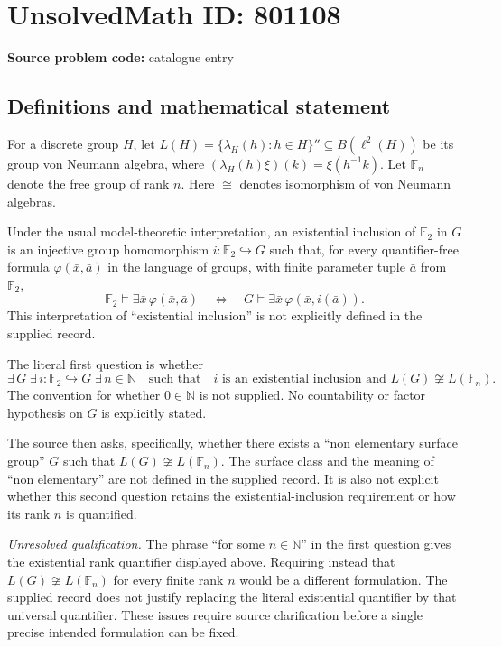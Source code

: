 \documentclass[11pt]{article}
\begin{document}
\section*{UnsolvedMath ID: 801108}
\textbf{Source problem code:} catalogue entry
\subsection{Definitions and mathematical statement}
For a discrete group \(H\), let \(L(H)=\{\lambda_H(h):h\in H\}''\subseteq B(\ell^2(H))\) be its group von Neumann algebra, where \((\lambda_H(h)\xi)(k)=\xi(h^{-1}k)\). Let \(\mathbb F_n\) denote the free group of rank \(n\). Here \(\cong\) denotes isomorphism of von Neumann algebras.

Under the usual model-theoretic interpretation, an existential inclusion of \(\mathbb F_2\) in \(G\) is an injective group homomorphism \(i:\mathbb F_2\hookrightarrow G\) such that, for every quantifier-free formula \(\varphi(\bar x,\bar a)\) in the language of groups, with finite parameter tuple \(\bar a\) from \(\mathbb F_2\),
\[
\mathbb F_2\models\exists\bar x\,\varphi(\bar x,\bar a)
\quad\Longleftrightarrow\quad
G\models\exists\bar x\,\varphi(\bar x,i(\bar a)).
\]
This interpretation of ``existential inclusion'' is not explicitly defined in the supplied record.

The literal first question is whether
\[
\exists\,G\;\exists\,i:\mathbb F_2\hookrightarrow G\;\exists\,n\in\mathbb N
\quad\text{such that}\quad
i\text{ is an existential inclusion and }L(G)\not\cong L(\mathbb F_n).
\]
The convention for whether \(0\in\mathbb N\) is not supplied. No countability or factor hypothesis on \(G\) is explicitly stated.

The source then asks, specifically, whether there exists a ``non elementary surface group'' \(G\) such that \(L(G)\not\cong L(\mathbb F_n)\). The surface class and the meaning of ``non elementary'' are not defined in the supplied record. It is also not explicit whether this second question retains the existential-inclusion requirement or how its rank \(n\) is quantified.

\emph{Unresolved qualification.} The phrase ``for some \(n\in\mathbb N\)'' in the first question gives the existential rank quantifier displayed above. Requiring instead that \(L(G)\not\cong L(\mathbb F_n)\) for every finite rank \(n\) would be a different formulation. The supplied record does not justify replacing the literal existential quantifier by that universal quantifier. These issues require source clarification before a single precise intended formulation can be fixed.
\end{document}

